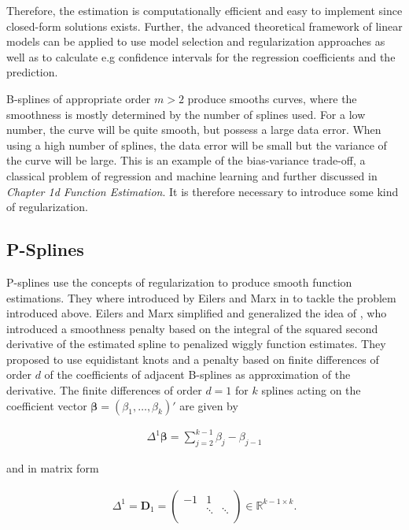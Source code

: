 \documentclass[10pt,a4paper]{article}
\begin{document}
Therefore, the estimation is computationally efficient and easy to implement since closed-form solutions exists. Further, the advanced theoretical framework of linear models can be applied to use model selection and regularization approaches as well as to calculate e.g confidence intervals for the regression coefficients and the prediction.

B-splines of appropriate order $m > 2$ produce smooths curves, where the smoothness is mostly determined by the number of splines used. For a low number, the curve will be quite smooth, but possess a large data error. When using a high number of splines, the data error will be small but the variance of the curve will be large. This is an example of the bias-variance trade-off, a classical problem of regression and machine learning and further discussed in \emph{Chapter 1d Function Estimation}. It is therefore necessary to introduce some kind of regularization. \cite{deBoor1978practicalGuideToSplines}  

\subsection{P-Splines} \label{subsec:Pspline}

P-splines use the concepts of regularization to produce smooth function estimations. They where introduced by Eilers and Marx in \cite{eilers1996flexible} to tackle the problem introduced above. Eilers and Marx simplified and generalized the idea of \cite{osullivan1986statistical}, who introduced a smoothness penalty based on the integral of the squared second derivative of the estimated spline to penalized wiggly function estimates. They proposed to use equidistant knots and a penalty based on finite differences of order $d$ of the coefficients of adjacent B-splines as approximation of the derivative. The finite differences of order $d=1$ for $k$ splines acting on the coefficient vector $\boldsymbol{\beta} = (\beta_1, \dots, \beta_k)'$ are given by

\begin{align}
	\Delta^1 \boldsymbol{\beta} = \sum_{j=2}^{k-1} \beta_{j} - \beta_{j-1}
\end{align}

and in matrix form

\begin{align}
	\Delta^1 = \boldsymbol{D}_1 = \begin{pmatrix} -1 & 1 \\ 
		                                             & \ddots & \ddots \\   
	                              \end{pmatrix} \in \mathbb{R}^{k-1 \times k}.
\end{align}
\end{document}
